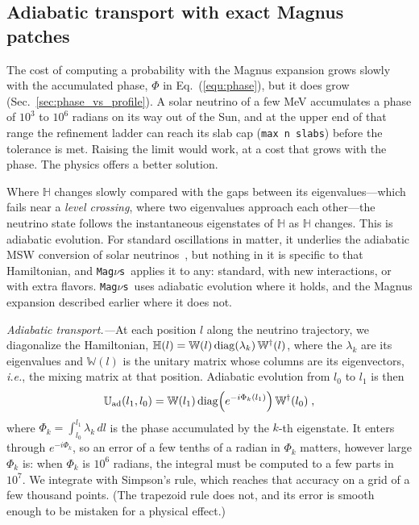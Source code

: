 \documentclass[final,5p,times,twocolumn,sort,compress]{elsarticle}
\makeatletter
\newcommand{\ie}{{\it i.e.}}
\newcommand{\eq}{Eq.}
\DeclareRobustCommand{\_}{%
  \ifmmode\nfss@text{\textunderscore}\else\textunderscore\allowbreak\fi}
\newcommand{\equ}[1]{\eq~(\ref{equ:#1})}
\newcommand{\magnus}{{\tt Mag}\ensuremath{\nu}{\tt s}}
\makeatother
\begin{document}
\subsection{Adiabatic transport with exact Magnus patches}
\label{sec:hybrid}

The cost of computing a probability with the Magnus expansion grows slowly with the accumulated phase, $\Phi$ in \equ{phase}, but it does grow (Sec.~\ref{sec:phase_vs_profile}). A solar neutrino of a few MeV accumulates a phase of $10^{3}$ to $10^{6}$ radians on its way out of the Sun, and at the upper end of that range the refinement ladder can reach its slab cap ({\tt max\_n\_slabs}) before the tolerance is met. Raising the limit would work, at a cost that grows with the phase. The physics offers a better solution.

Where $\mathbb{H}$ changes slowly compared with the gaps between its eigenvalues---which fails near a \emph{level crossing}, where two eigenvalues approach each other---the neutrino state follows the instantaneous eigenstates of $\mathbb{H}$ as $\mathbb{H}$ changes. This is adiabatic evolution. For standard oscillations in matter, it underlies the adiabatic MSW conversion of solar neutrinos\ \cite{Wolfenstein:1977ue, Mikheev:1986gs, Parke:1986jy, Bethe:1986ej, Kuo:1989qe}, but nothing in it is specific to that Hamiltonian, and \magnus\ applies it to any: standard, with new interactions, or with extra flavors. \magnus\ uses adiabatic evolution where it holds, and the Magnus expansion described earlier where it does not.

\smallskip

\textit{Adiabatic transport.---}At each position $l$ along the neutrino trajectory, we diagonalize the Hamiltonian, $\mathbb{H}(l) = \mathbb{W}(l)\,{\rm diag}(\lambda_k)\,\mathbb{W}^\dagger(l)$, where the $\lambda_k$ are its eigenvalues and $\mathbb{W}(l)$ is the unitary matrix whose columns are its eigenvectors, \ie, the mixing matrix at that position. Adiabatic evolution from $l_0$ to $l_1$ is then
\begin{equation}
 \label{equ:adiabatic}
 \mathbb{U}_{\rm ad}(l_1, l_0)
 =
 \mathbb{W}(l_1)\,{\rm diag}\!\left(e^{-i\Phi_k(l_1)}\right)\mathbb{W}^\dagger(l_0) \;,
\end{equation}
where $\Phi_k = \int_{l_0}^{l_1} \lambda_k\,dl$ is the phase accumulated by the $k$-th eigenstate. It enters through $e^{-i\Phi_k}$, so an error of a few tenths of a radian in $\Phi_k$ matters, however large $\Phi_k$ is: when $\Phi_k$ is $10^{6}$ radians, the integral must be computed to a few parts in $10^{7}$. We integrate with Simpson's rule, which reaches that accuracy on a grid of a few thousand points. (The trapezoid rule does not, and its error is smooth enough to be mistaken for a physical effect.)
\end{document}
